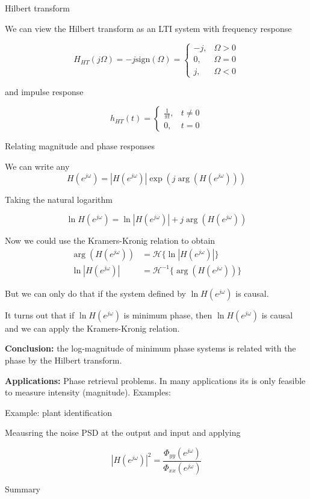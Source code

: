 \documentclass[10pt]{beamer}
\begin{document}
\begin{frame}{Hilbert transform}

We can view the Hilbert transform as an LTI system with frequency response

\begin{equation*}
H_{HT}(j\Omega) = -j\mathrm{sign}(\Omega) = \begin{cases}
-j, & \Omega > 0 \\
0, & \Omega = 0 \\
j, & \Omega < 0
\end{cases}
\end{equation*}

and impulse response

\begin{equation*}
h_{HT}(t) = \begin{cases}
\frac{1}{\pi t}, & t \neq 0 \\
0, & t = 0
\end{cases}
\end{equation*}

\end{frame}

\begin{frame}{Relating magnitude and phase responses}

We can write any 
\begin{equation*}
H(e^{j\omega}) = |H(e^{j\omega})|\exp(j\arg(H(e^{j\omega})))
\end{equation*}

Taking the natural logarithm 

\begin{equation*}
\ln H(e^{j\omega}) = \ln |H(e^{j\omega})| + j\arg(H(e^{j\omega}))
\end{equation*}

Now we could use the Kramers-Kronig relation to obtain
\begin{align*}
\arg(H(e^{j\omega})) &= \mathcal{H}\{\ln |H(e^{j\omega})|\} \\
\ln |H(e^{j\omega})| &= \mathcal{H}^{-1}\{\arg(H(e^{j\omega}))\}
\end{align*}

But we can only do that if the system defined by $\ln H(e^{j\omega})$ is causal.

It turns out that if  $\ln H(e^{j\omega})$ is minimum phase, then  $\ln H(e^{j\omega})$ is causal and we can apply the Kramers-Kronig relation.

\textbf{Conclusion:} the log-magnitude of minimum phase systems is related with the phase by the Hilbert transform.

\textbf{Applications:} Phase retrieval problems. In many applications its is only feasible to measure intensity (magnitude). Examples: 

\end{frame}

\begin{frame}{Example: plant identification}

Meausring the noise PSD at the output and input and applying 

\begin{equation*}
|H(e^{j\omega})|^2 = \frac{\Phi_{yy}(e^{j\omega})}{\Phi_{xx}(e^{j\omega})} \tag{only know the magnitude}
\end{equation*}

\end{frame}

\begin{frame}{Summary}

\end{frame}
\end{document}
